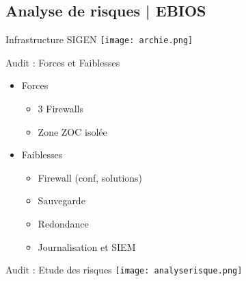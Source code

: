 \subsection{Analyse de risques | EBIOS}

\begin{frame}{Infrastructure SIGEN}
    \texttt{[image: archie.png]}
\end{frame}

\begin{frame}{Audit : Forces et Faiblesses}
    \begin{itemize}
        \item Forces
            \begin{itemize}
                \item 3 Firewalls
                \item Zone ZOC isol\'ee
            \end{itemize}
        \vspace{.5cm}
        \item Faiblesses
            \begin{itemize}
                \item Firewall (conf, solutions)
                \item Sauvegarde
                \item Redondance
                \item Journalisation et SIEM
            \end{itemize}
    \end{itemize}
\end{frame}

\begin{frame}{Audit : Etude des risques}
    \texttt{[image: analyserisque.png]}
\end{frame}

